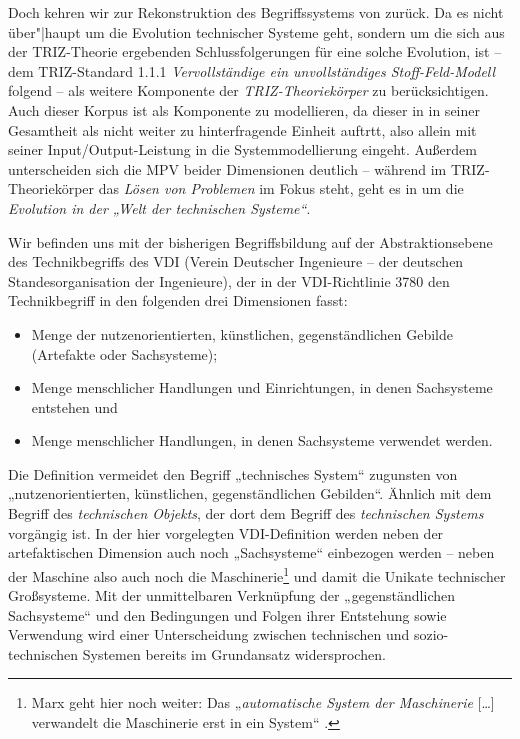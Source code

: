 \documentclass[11pt,a4paper]{article}
\begin{document}
Doch kehren wir zur Rekonstruktion des Begriffssystems von \cite{TESE2018}
zurück.  Da es nicht über"|haupt um die Evolution technischer Systeme geht,
sondern um die sich aus der TRIZ-Theorie ergebenden Schlussfolgerungen für
eine solche Evolution, ist -- dem TRIZ-Standard 1.1.1 \emph{Vervollständige
  ein unvollständiges Stoff-Feld-Modell} folgend -- als weitere Komponente der
\emph{TRIZ-Theoriekörper} zu berücksichtigen. Auch dieser Korpus ist als
Komponente zu modellieren, da dieser in \cite{TESE2018} in seiner Gesamtheit
als nicht weiter zu hinterfragende Einheit auftrtt, also allein mit seiner
Input/Output-Leistung in die Systemmodellierung eingeht.  Außerdem
unterscheiden sich die MPV beider Dimensionen deutlich -- während im
TRIZ-Theoriekörper das \emph{Lösen von Problemen} im Fokus steht, geht es in
\cite{TESE2018} um die \emph{Evolution in der „Welt der technischen Systeme“}.

Wir befinden uns mit der bisherigen Begriffsbildung auf der Abstraktionsebene
des Technikbegriffs des VDI (Verein Deutscher Ingenieure -- der deutschen
Standesorganisation der Ingenieure), der in der VDI-Richtlinie 3780 den
Technikbegriff in den folgenden drei Dimensionen fasst:
\begin{itemize}
\item Menge der nutzenorientierten, künstlichen, gegenständlichen Gebilde
  (Artefakte oder Sachsysteme);
\item Menge menschlicher Handlungen und Einrichtungen, in denen Sachsysteme
  entstehen und
\item Menge menschlicher Handlungen, in denen Sachsysteme verwendet werden.
\end{itemize}
Die Definition vermeidet den Begriff „technisches System“ zugunsten von
„nutzenorientierten, künstlichen, gegenständlichen Gebilden“. Ähnlich
\cite{Shpakovsky2003} mit dem Begriff des \emph{technischen Objekts}, der dort
dem Begriff des \emph{technischen Systems} vorgängig ist. In der hier
vorgelegten VDI-Definition werden neben der artefaktischen Dimension auch noch
„Sachsysteme“ einbezogen werden -- neben der Maschine also auch noch die
Maschinerie\footnote{Marx geht hier noch weiter: Das „\emph{automatische
    System der Maschinerie} [\ldots] verwandelt die Maschinerie erst in ein
  System“ \cite[S. 584]{MEW42}.} und damit die Unikate technischer
Großsysteme.  Mit der unmittelbaren Verknüpfung der „gegenständlichen
Sachsysteme“ und den Bedingungen und Folgen ihrer Entstehung sowie Verwendung
wird einer Unterscheidung zwischen technischen und sozio-technischen Systemen
bereits im Grundansatz widersprochen.
\end{document}
